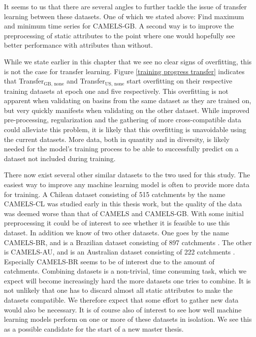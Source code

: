 It seems to us that there are several angles to further tackle the issue of transfer 
learning between these datasets. One of which we stated above: Find maximum and minimum time series for 
CAMELS-GB. A second way is to improve the preprocessing of static attributes to 
the point where one would hopefully see better performance with attributes than 
without. 

While we state earlier in this chapter that we see no clear signs of overfitting, this is not 
the case for transfer learning. Figure 
\ref{training progress transfer} indicates that Transfer$_\text{GB, none}$ 
and Transfer$_\text{US, none}$ start overfitting on their respective training 
datasets at epoch one and five respectively. This overfitting is not apparent when
validating on basins from the 
same dataset as they are trained on, but very quickly manifests when validating 
on the other dataset. While improved pre-processing, regularization and the gathering 
of more  cross-compatible data could alleviate this problem, it is likely that this 
overfitting is 
unavoidable using the current datasets. More data, both in quantity and in 
diversity, is likely needed for the model's training process to be able to 
successfully predict on a dataset not included during training.

There now exist several other similar datasets to the two used for this study. 
The easiest way to improve 
any machine learning model is often to provide more data for training. A Chilean 
dataset consisting of 515 catchments by the name CAMELS-CL \citep{CAMELS_CL} 
was studied early in this thesis work, but the quality 
of the data was deemed worse than that of CAMELS and CAMELS-GB. With some initial 
preprocessing it could be of interest to see whether it is feasible to use this 
dataset.
In addition we know of two other datasets. One goes by the name CAMELS-BR, and is 
a Brazilian dataset consisting of 897 catchments \citep{CAMELS_BR}.
The other is CAMELS-AU, and is an Australian dataset consisting of 222 catchments
 \citep{CAMELS_AU}. Especially CAMELS-BR seems to be of interest due to the 
amount of catchments. Combining datasets is a non-trivial, time consuming task, which 
we expect will become increasingly hard the more datasets one tries to combine. 
It is not unlikely that one has to discard almost all static attributes to make 
the datasets compatible. We therefore expect that some effort to gather new data 
would also be necessary. It is of course also of interest to see how well machine 
learning models perform on one or more of these datasets in isolation. 
We see this as a possible candidate for the start of a new master thesis.
